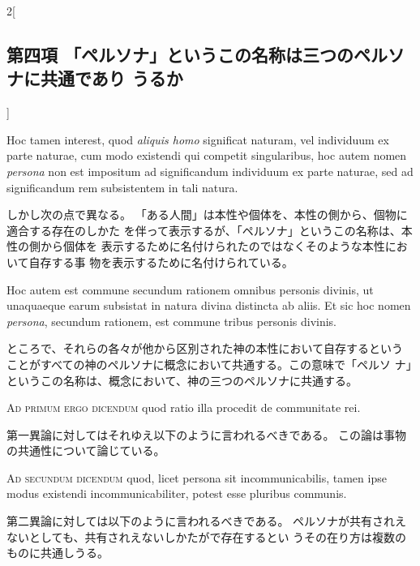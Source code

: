 \documentclass[paper=a4paper,fontsize=10pt,jafontsize=9pt,titlepage]{jlreq}
\begin{document}
\begin{paracol}{2}[\subsection{第四項 「ペルソナ」というこの名称は三つのペルソナに共通であり うるか}]
\switchcolumn*


Hoc tamen
interest, quod {\itshape aliquis homo} significat naturam, vel individuum ex
parte naturae, cum modo existendi qui competit singularibus, hoc autem
nomen {\itshape persona} non est impositum ad significandum individuum ex parte
naturae, sed ad significandum rem subsistentem in tali natura.


\switchcolumn


しかし次の点で異なる。
 「ある人間」は本性や個体を、本性の側から、個物に適合する存在のしかた
 を伴って表示するが、「ペルソナ」というこの名称は、本性の側から個体を
 表示するために名付けられたのではなくそのような本性において自存する事
 物を表示するために名付けられている。


\switchcolumn*


Hoc
autem est commune secundum rationem omnibus personis divinis, ut
unaquaeque earum subsistat in natura divina distincta ab aliis. Et sic
hoc nomen {\itshape persona}, secundum rationem, est commune tribus personis
divinis.


\switchcolumn


ところで、それらの各々が他から区別された神の本性において自存するという
 ことがすべての神のペルソナに概念において共通する。この意味で「ペルソ
 ナ」というこの名称は、概念において、神の三つのペルソナに共通する。


\switchcolumn*[\subsection{ad.1}]


{\scshape Ad primum ergo dicendum} quod ratio illa procedit de communitate rei.


\switchcolumn


第一異論に対してはそれゆえ以下のように言われるべきである。
この論は事物の共通性について論じている。


\switchcolumn*[\subsection{ad.2}]


{\scshape Ad secundum dicendum} quod, licet persona sit incommunicabilis, tamen
ipse modus existendi incommunicabiliter, potest esse pluribus
communis.


\switchcolumn


第二異論に対しては以下のように言われるべきである。
ペルソナが共有されえないとしても、共有されえないしかたがで存在するとい
 うその在り方は複数のものに共通しうる。



\end{paracol}
\end{document}
